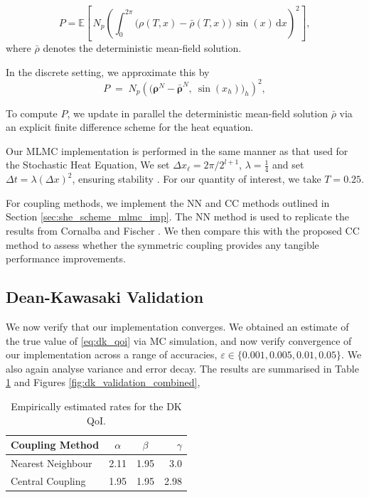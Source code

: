 \begin{equation}\label{eq:dk_qoi}
P = \mathbb{E}\!\left[\,N_p \left(\int_0^{2\pi} 
\big(\rho(T,x)-\bar{\rho}(T,x)\big)\,\sin(x)\,\mathrm{d}x\right)^{\!2}\right],
\end{equation}
where $\bar\rho$ denotes the deterministic mean-field solution.

In the discrete setting, we approximate this by
\begin{equation}
P \;=\; N_p \left( \big(\boldsymbol{\rho}^N - \boldsymbol{\bar\rho}^N,\ 
\sin(x_h)\big)_h \right)^{\!2},
\end{equation}

To compute $P$, we update in parallel the 
deterministic mean-field 
solution $\bar\rho$ via an explicit finite difference scheme for the 
heat equation.

Our MLMC implementation is performed in the same manner as that 
used for the Stochastic Heat Equation,
We set $\Delta x_\ell = 2 \pi / 2^{l + 1}$, $\lambda = \frac{1}{4}$
and set $\Delta t = \lambda (\Delta x)^2$, ensuring stability 
\cite{cornalba2025multilevel}.
For our quantity of interest, we take $T=0.25$.

For coupling methods, we implement the NN and CC methods outlined in 
Section \ref{sec:she_scheme_mlmc_imp}. The NN method is 
used to replicate the results from Cornalba and Fischer \cite{cornalba2025multilevel}.
We then compare this with the proposed CC method to assess 
whether the symmetric coupling provides any tangible performance 
improvements.

\subsection{Dean-Kawasaki Validation}\label{sec:dk_validation}

We now verify that our implementation converges. We obtained an estimate of the true 
value of \eqref{eq:dk_qoi} via MC simulation, and now verify convergence 
of our implementation across a range of accuracies, 
$\varepsilon \in \{0.001, 0.005, 0.01, 0.05\}$. We also again 
analyse variance and error decay. The results are summarised in Table 
\ref{tab:dk_rates} and Figures \ref{fig:dk_validation_combined},

\begin{table}[htbp]
    \centering
    \begin{tabular}{|l|c|c|r|}
        \hline
        \textbf{Coupling Method} & \textbf{$\alpha$} & \textbf{$\beta$} & \textbf{$\gamma$} \\
        \hline
        Nearest Neighbour & 2.11 & 1.95 & 3.0\\
        Central Coupling & 1.95 & 1.95 & 2.98 \\
        \hline
    \end{tabular}
    \caption{Empirically estimated rates for the DK QoI.}
    \label{tab:dk_rates}
\end{table}

